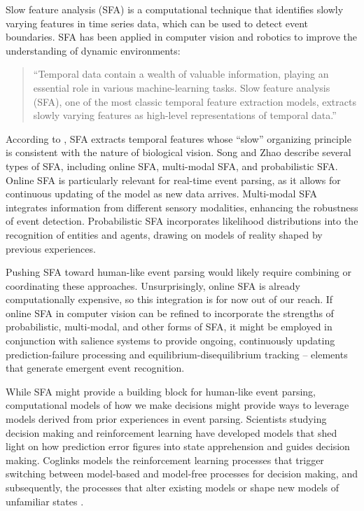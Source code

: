 \documentclass[11pt,a4paper]{article}
\begin{document}
Slow feature analysis (SFA) is a computational technique that identifies slowly varying features in time series data, which can be used to detect event boundaries. SFA has been applied in computer vision and robotics to improve the understanding of dynamic environments:

\begin{quote}
``Temporal data contain a wealth of valuable information, playing an essential role in various machine-learning tasks. Slow feature analysis (SFA), one of the most classic temporal feature extraction models, extracts slowly varying features as high-level representations of temporal data.'' \citep{song2022slow}
\end{quote}

According to \citet{song2022slow}, SFA extracts temporal features whose ``slow'' organizing principle is consistent with the nature of biological vision. Song and Zhao describe several types of SFA, including online SFA, multi-modal SFA, and probabilistic SFA. Online SFA is particularly relevant for real-time event parsing, as it allows for continuous updating of the model as new data arrives. Multi-modal SFA integrates information from different sensory modalities, enhancing the robustness of event detection. Probabilistic SFA incorporates likelihood distributions into the recognition of entities and agents, drawing on models of reality shaped by previous experiences.

Pushing SFA toward human-like event parsing would likely require combining or coordinating these approaches. Unsurprisingly, online SFA is already computationally expensive, so this integration is for now out of our reach. If online SFA in computer vision can be refined to incorporate the strengths of probabilistic, multi-modal, and other forms of SFA, it might be employed in conjunction with salience systems to provide ongoing, continuously updating prediction-failure processing and equilibrium-disequilibrium tracking -- elements that generate emergent event recognition.

While SFA might provide a building block for human-like event parsing, computational models of how we make decisions might provide ways to leverage models derived from prior experiences in event parsing. Scientists studying decision making and reinforcement learning have developed models that shed light on how prediction error figures into state apprehension and guides decision making. Coglinks models the reinforcement learning processes that trigger switching between model-based and model-free processes for decision making, and subsequently, the processes that alter existing models or shape new models of unfamiliar states \citep{wang2025neural}.
\end{document}
